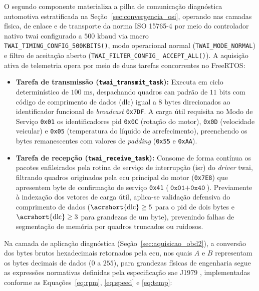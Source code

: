 \documentclass[
	12pt,				%
	openright,			%
	twoside,			%
	a4paper,			%
	english,			%
	brazil				%
	]{abntex2}
\newcounter{quadro}
\begin{document}
O segundo componente materializa a pilha de comunicação diagnóstica automotiva
estratificada na Seção~\ref{sec:convergencia_osi}, operando nas camadas física, de
enlace e de transporte da norma ISO 15765-4 \cite{iso15765} por meio do controlador
nativo \acrshort{twai} configurado a $500\text{ kbaud}$ via macro
\texttt{TWAI\_TIMING\_\allowbreak CONFIG\_\allowbreak 500KBITS()}, modo operacional
normal (\texttt{TWAI\_\allowbreak MODE\_\allowbreak NORMAL}) e filtro de aceitação
aberto (\texttt{TWAI\_\allowbreak FILTER\_\allowbreak CONFIG\_\allowbreak
ACCEPT\_\allowbreak ALL()}). A aquisição ativa de telemetria opera por meio de duas
tarefas concorrentes no FreeRTOS:

\begin{itemize}
    \item \textbf{Tarefa de transmissão (\texttt{twai\_transmit\_task}):} Executa em
        ciclo determinístico de $100\text{ ms}$, despachando quadros \acrshort{can}
        padrão de $11\text{ bits}$ com código de comprimento de dados (\acrshort{dlc})
        igual a $8\text{ bytes}$ direcionados ao identificador funcional de
        \textit{broadcast} \texttt{0x7DF}. A carga útil requisita no Modo de Serviço
        \texttt{0x01} os identificadores \acrshort{pid} \texttt{0x0C} (rotação do
        motor), \texttt{0x0D} (velocidade veicular) e \texttt{0x05} (temperatura do
        líquido de arrefecimento), preenchendo os bytes remanescentes com valores de
        \textit{padding} (\texttt{0x55} e \texttt{0xAA}).
    \item \textbf{Tarefa de recepção (\texttt{twai\_receive\_task}):} Consome de forma
        contínua os pacotes enfileirados pela rotina de serviço de interrupção
        (\acrshort{isr}) do \textit{driver} \acrshort{twai}, filtrando quadros
        originados pela \acrshort{ecu} principal do motor (\texttt{0x7E8}) que
        apresentem byte de confirmação de serviço \texttt{0x41}
        ($\texttt{0x01} + \texttt{0x40}$). Previamente à indexação dos vetores de carga
        útil, aplica-se validação defensiva do comprimento de dados
        ($\text{\acrshort{dlc}} \ge 5$ para o \acrshort{pid} de dois bytes e
        $\text{\acrshort{dlc}} \ge 3$ para grandezas de um byte), prevenindo falhas de
        segmentação de memória por quadros truncados ou ruidosos.
\end{itemize}

Na camada de aplicação diagnóstica (Seção~\ref{sec:aquisicao_obd2}), a conversão dos
bytes brutos hexadecimais retornados pela \acrshort{ecu}, nos quais $A$ e $B$
representam os bytes decimais de dados ($0$ a $255$), para grandezas físicas de
engenharia segue as expressões normativas definidas pela especificação \acrshort{sae}
J1979 \cite{saej1979}, implementadas conforme as Equações~\eqref{eq:rpm},
\eqref{eq:speed} e \eqref{eq:temp}:
\end{document}
